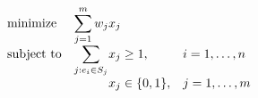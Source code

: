 \documentclass{article}
\begin{document}
	
$$
\begin{array}{ll@{}ll}         %
\text{minimize}  & \displaystyle\sum\limits_{j=1}^{m} w_{j}&x_{j} &\\
\text{subject to}& \displaystyle\sum\limits_{j:e_{i} \in S_{j}}   &x_{j} \geq 1,  &i=1 ,\dots, n\\
                 &                                                &x_{j} \in \{0,1\}, &j=1 ,\dots, m
\end{array}
$$
	
\end{document}
